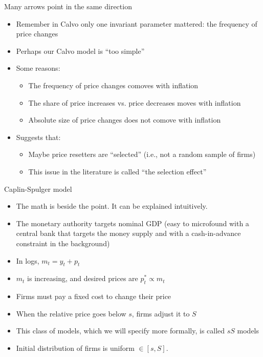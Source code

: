 \documentclass[11pt,aspectratio=169,xcolor={dvipsnames},hyperref={pdftex,pdfpagemode=UseNone,hidelinks,pdfdisplaydoctitle=true},usepdftitle=false]{beamer}
\begin{document}
\begin{frame}{Many arrows point in the same direction}
\begin{itemize}
\item Remember in Calvo only one invariant parameter mattered: the frequency of price changes
\item Perhaps our Calvo model is ``too simple''
\item Some reasons:
\begin{itemize}
\item The frequency of price changes comoves with inflation
\item The share of price increases vs. price decreases moves with inflation
\item Absolute size of price changes does not comove with inflation
\end{itemize}
\item Suggests that:
\begin{itemize}
\item Maybe price resetters are ``selected'' (i.e., not a random sample of firms)
\item This issue in the literature is called ``the selection effect''
\end{itemize}
\end{itemize}
\end{frame}

\begin{frame}{Caplin-Spulger model}
\begin{itemize}
\item The math is beside the point. It can be explained intuitively.
\item The monetary authority targets nominal GDP (easy to microfound with a central bank that targets the money supply and with a cash-in-advance constraint in the background)
\item In logs, $m_t = y_t + p_t$
\item $m_t$ is increasing, and desired prices are $p^*_t \propto m_t$
\item Firms must pay a fixed cost to change their price
\item When the relative price goes below $s$, firms adjust it to $S$
\item This class of models, which we will specify more formally, is called $sS$ models
\item Initial distribution of firms is uniform $\in [s,S]$.
\end{itemize}
\end{frame}
\end{document}
